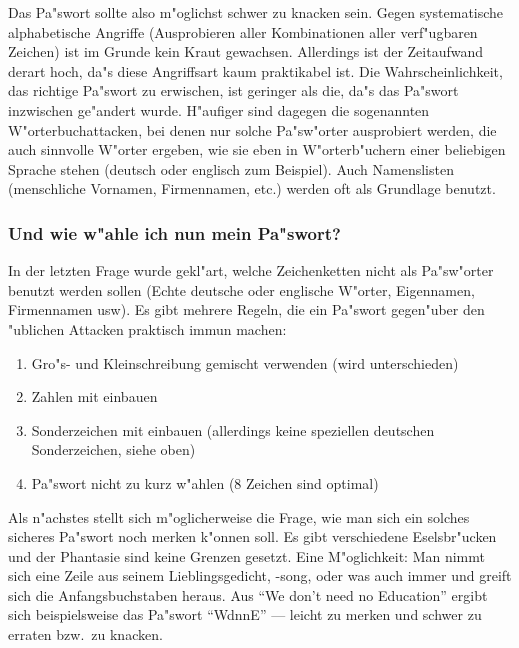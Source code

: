 \documentclass[12pt,titlepage,twoside]{scrartcl}
\begin{document}
Das Pa"swort sollte also m"oglichst schwer zu knacken sein. Gegen systematische
alphabetische Angriffe (Ausprobieren aller Kombinationen aller verf"ugbaren
Zeichen) ist im Grunde kein Kraut gewachsen. Allerdings ist der Zeitaufwand
derart hoch, da"s diese Angriffsart kaum praktikabel ist. Die
Wahrscheinlichkeit, das richtige Pa"swort zu erwischen, ist geringer als die,
da"s das Pa"swort inzwischen ge"andert wurde. H"aufiger sind dagegen die
sogenannten W"orterbuchattacken, bei denen nur solche Pa"sw"orter ausprobiert
werden, die auch sinnvolle W"orter ergeben, wie sie eben in W"orterb"uchern einer
beliebigen Sprache stehen (deutsch oder englisch zum Beispiel). Auch
Namenslisten (menschliche Vornamen, Firmennamen, etc.) werden oft als
Grundlage benutzt.

\subsubsection*{Und wie w"ahle ich nun mein Pa"swort?}

In der letzten Frage wurde gekl"art, welche Zeichenketten nicht als Pa"sw"orter
benutzt werden sollen (Echte deutsche oder englische W"orter, Eigennamen,
Firmennamen usw). Es gibt mehrere Regeln, die ein Pa"swort gegen"uber den
"ublichen Attacken praktisch immun machen: 

\begin{enumerate}
  \item Gro"s- und Kleinschreibung gemischt verwenden (wird unterschieden)
  \item Zahlen mit einbauen
  \item Sonderzeichen mit einbauen (allerdings keine speziellen deutschen
    Sonderzeichen, siehe oben)
  \item Pa"swort nicht zu kurz w"ahlen (8 Zeichen sind optimal) 
\end{enumerate}

Als n"achstes stellt sich m"oglicherweise die Frage, wie man sich ein solches
sicheres Pa"swort noch merken k"onnen soll. Es gibt verschiedene Eselsbr"ucken
und der Phantasie sind keine Grenzen gesetzt. Eine M"oglichkeit: Man nimmt sich
eine Zeile aus seinem Lieblingsgedicht, -song, oder was auch immer und greift
sich die Anfangsbuchstaben heraus. Aus "`We don't need no Education"' ergibt
sich beispielsweise das Pa"swort "`WdnnE"' --- leicht zu merken und schwer zu
erraten bzw.\  zu knacken.
\end{document}
